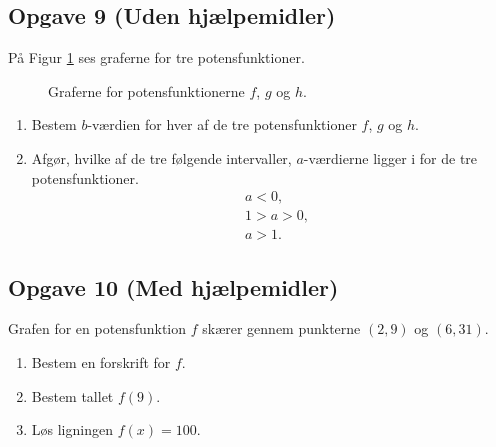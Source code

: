 \subsection*{Opgave 9 (Uden hjælpemidler)}
På Figur \ref{fig:potens} ses graferne for tre potensfunktioner.
\begin{figure}[H]
	\centering
	\caption{Graferne for potensfunktionerne $f$, $g$ og $h$.}
	\label{fig:potens}
\end{figure}
\begin{enumerate}[label=\roman*)]
	\item Bestem $b$-værdien for hver af de tre potensfunktioner $f$, $g$ og $h$. 
	\item Afgør, hvilke af de tre følgende intervaller, $a$-værdierne ligger i for de tre potensfunktioner. 
	\begin{align*}
		&a < 0,\\
		&1 > a > 0,\\
		&a > 1.
	\end{align*}
\end{enumerate}

\subsection*{Opgave 10 (Med hjælpemidler)}
Grafen for en potensfunktion $f$ skærer gennem punkterne $(2,9)$ og $(6,31)$. 
\begin{enumerate}[label=\roman*)]
	\item Bestem en forskrift for $f$. 
	\item Bestem tallet $f(9)$. 
	\item Løs ligningen $f(x) = 100$.
\end{enumerate}

